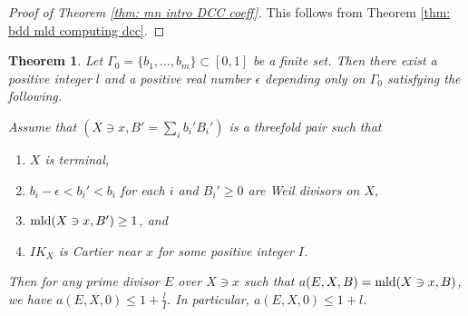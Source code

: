 \documentclass[11pt]{amsart}
\numberwithin{equation}{section}
\newcommand\han[1]{\todo[color=yellow!40]{#1}} %
\newcommand{\mld}{{\rm{mld}}}
\newcommand{\Ii}{{\Gamma}}
\newtheorem{thm}{Theorem}[section]
\theoremstyle{definition}
\theoremstyle{definition}
\begin{document}
\begin{proof}[Proof of Theorem \ref{thm: mn intro DCC coeff}]
This follows from Theorem \ref{thm: bdd mld computing dcc}.
\end{proof}



\begin{thm}\label{thm: uniform bdd mld computing dcc}
Let $\Ii_0=\{b_1,\ldots,b_m\}\subset [0,1]$ be a finite set. Then there exist a positive integer $l$ and a positive real number $\epsilon$ depending only on $\Ii_0$ satisfying the following. 

Assume that $(X\ni x,B'=\sum_{i} b_i'B_i')$ is a threefold pair such that 
\begin{enumerate}
    \item $X$ is terminal,
    \item $b_i-\epsilon<b_i'<b_i$ for each $i$ and $B_i'\ge 0$ are Weil divisors on $X$,
    \item $\mld(X\ni x,B')\ge 1$, and
    \item $IK_X$ is Cartier near $x$ for some positive integer $I$.
\end{enumerate}
Then for any prime divisor $E$ over $X\ni x$ such that $a(E,X,B)=\mld(X\ni x,B)$, we have $a(E,X,0)\leq 1+\frac{l}{I}.$ In particular, $a(E,X,0)\le 1+l$. 
\end{thm}
\end{document}
